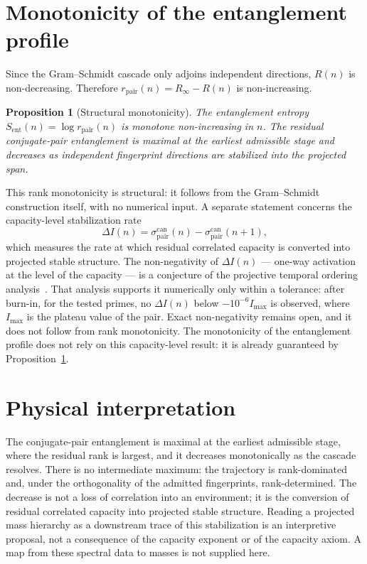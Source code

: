 \documentclass[11pt]{article}
\newtheorem{proposition}{Proposition}
\newcommand{\Sent}{S_{\mathrm{ent}}}
\newcommand{\rpair}{r_{\mathrm{pair}}}
\newcommand{\spair}{\sigma^{\mathrm{can}}_{\mathrm{pair}}}
\begin{document}
  \section{Monotonicity of the entanglement profile}
    \label{sec:monotonicity}

    Since the Gram--Schmidt cascade only adjoins independent directions, $R(n)$ is non-decreasing.
    Therefore $\rpair(n)=R_\infty-R(n)$ is non-increasing.

    \begin{proposition}[Structural monotonicity]
      \label{prop:mono}
      The entanglement entropy $\Sent(n)=\log \rpair(n)$ is monotone non-increasing in $n$.
      The residual conjugate-pair entanglement is maximal at the earliest admissible stage and decreases as
      independent fingerprint directions are stabilized into the projected span.
    \end{proposition}

    This rank monotonicity is structural: it follows from the Gram--Schmidt construction itself, with no
    numerical input.
    A separate statement concerns the capacity-level stabilization rate
    \[
      \Delta I(n)=\spair(n)-\spair(n+1),
    \]
    which measures the rate at which residual correlated capacity is converted into projected stable structure.
    The non-negativity of $\Delta I(n)$ --- one-way activation at the level of the capacity --- is a conjecture
    of the projective temporal ordering analysis~\cite{Beau2026pto}.
    That analysis supports it numerically only within a tolerance: after burn-in, for the tested primes, no
    $\Delta I(n)$ below $-10^{-6} I_{\max}$ is observed, where $I_{\max}$ is the plateau value of the pair.
    Exact non-negativity remains open, and it does not follow from rank monotonicity.
    The monotonicity of the entanglement profile does not rely on this capacity-level result: it is already
    guaranteed by Proposition~\ref{prop:mono}.

  \section{Physical interpretation}
    \label{sec:interpretation}

    The conjugate-pair entanglement is maximal at the earliest admissible stage, where the residual rank is
    largest, and it decreases monotonically as the cascade resolves.
    There is no intermediate maximum: the trajectory is rank-dominated and, under the orthogonality of the
    admitted fingerprints, rank-determined.
    The decrease is not a loss of correlation into an environment; it is the conversion of residual correlated
    capacity into projected stable structure.
    Reading a projected mass hierarchy as a downstream trace of this stabilization is an interpretive proposal,
    not a consequence of the capacity exponent or of the capacity axiom.
    A map from these spectral data to masses is not supplied here.
\end{document}
